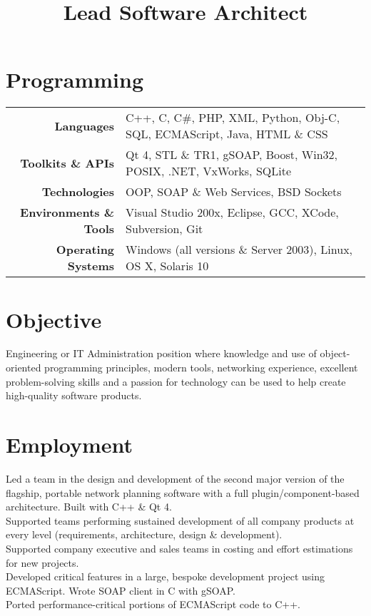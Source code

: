 \documentclass{resume}
\begin{document}
\address{89 Barley Leaze\\Chippenham\\SN14 6GW\\UK}
\address{lee@leegent.net\\+44 7748 183797}

\begin{resume}

\section{Programming}
{\small
\begin{tabular}{rl}
\textbf{Languages} & C++, C, C\#, PHP, XML, Python, Obj-C, SQL, ECMAScript, Java, HTML \& CSS \\
\textbf{Toolkits \& APIs} & Qt 4, STL \& TR1, gSOAP, Boost, Win32, POSIX, .NET, VxWorks, SQLite \\
\textbf{Technologies} & OOP, SOAP \& Web Services, BSD Sockets \\
\textbf{Environments \& Tools} & Visual Studio 200x, Eclipse, GCC, XCode, Subversion, Git \\
\textbf{Operating Systems} & Windows (all versions \& Server 2003), Linux, OS X, Solaris 10
\end{tabular}
}
\section{Objective}
Engineering or IT Administration position where knowledge and use of object-oriented programming principles, modern tools, networking experience, excellent problem-solving skills and a passion for technology can be used to help create high-quality software products.

\section{Employment}

\title{\bf{Lead Software Architect}}
\begin{position}
Led a team in the design and development of the second major version of the flagship, portable network planning software with a full plugin/component-based architecture.  Built with C++ \& Qt 4.\vspace{1mm}\\
Supported teams performing sustained development of all company products at every level (requirements, architecture, design \& development).\vspace{1mm}\\
Supported company executive and sales teams in costing and effort estimations for new projects.\vspace{1mm}\\
Developed critical features in a large, bespoke development project using ECMAScript.  Wrote SOAP client in C with gSOAP.\vspace{1mm}\\
Ported performance-critical portions of ECMAScript code to C++.
\end{position}


\end{resume}
\end{document}
